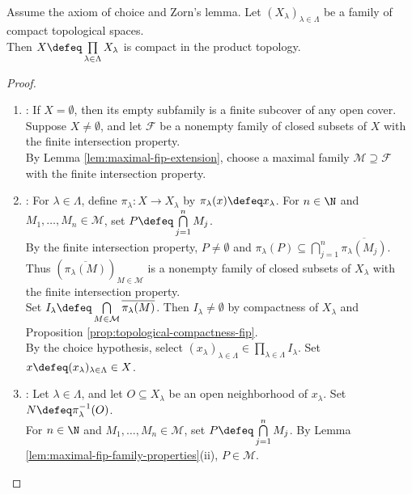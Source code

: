 \begin{theorem} \label{thm:tychonoff-product-theorem} \\
Assume the axiom of choice and Zorn's lemma. Let $(X_\lambda)_{\lambda\in\Lambda}$ be a family of compact topological spaces.\\
Then $X\defeq\prod\limits_{\lambda\in\Lambda}X_\lambda$ is compact in the product topology.
\begin{proof}
\begin{enumerate}[label=(\roman*)]
\setlength{\itemsep}{0pt}
\item {}: If $X=\emptyset$, then its empty subfamily is a finite subcover of any open cover.\\
Suppose $X\neq\emptyset$, and let $\mathcal{F}$ be a nonempty family of closed subsets of $X$ with the finite intersection property.\\
By Lemma \ref{lem:maximal-fip-extension}, choose a maximal family $\mathcal{M}\supseteq\mathcal{F}$ with the finite intersection property.
\item {}: For $\lambda\in\Lambda$, define $\pi_\lambda:X\to X_\lambda$ by $\pi_\lambda(x)\defeq x_\lambda$. For $n\in\N$ and $M_1,\ldots,M_n\in\mathcal{M}$, set $P\defeq\bigcap\limits_{j=1}^nM_j$.\\
By the finite intersection property, $P\neq\emptyset$ and $\pi_\lambda(P)\subseteq\bigcap\limits_{j=1}^n\overline{\pi_\lambda(M_j)}$.\\
Thus $(\overline{\pi_\lambda(M)})_{M\in\mathcal{M}}$ is a nonempty family of closed subsets of $X_\lambda$ with the finite intersection property.\\
Set $I_\lambda\defeq\bigcap\limits_{M\in\mathcal{M}}\overline{\pi_\lambda(M)}$. Then $I_\lambda\neq\emptyset$ by compactness of $X_\lambda$ and Proposition \ref{prop:topological-compactness-fip}.\\
By the choice hypothesis, select $(x_\lambda)_{\lambda\in\Lambda}\in\prod\limits_{\lambda\in\Lambda}I_\lambda$. Set $x\defeq(x_\lambda)_{\lambda\in\Lambda}\in X$.
\item {}: Let $\lambda\in\Lambda$, and let $O\subseteq X_\lambda$ be an open neighborhood of $x_\lambda$. Set $N\defeq\pi_\lambda^{-1}(O)$.\\
For $n\in\N$ and $M_1,\ldots,M_n\in\mathcal{M}$, set $P\defeq\bigcap\limits_{j=1}^nM_j$. By Lemma \ref{lem:maximal-fip-family-properties}(ii), $P\in\mathcal{M}$.\\

\end{enumerate}
\end{proof}
\end{theorem}
